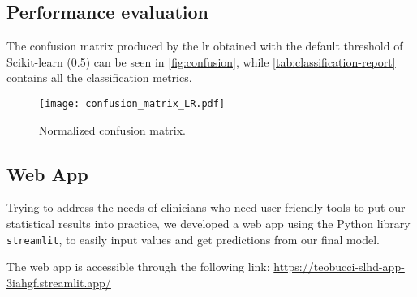 


\subsection{Performance evaluation}

The confusion matrix produced by the \gls{lr} obtained with the default threshold of Scikit-learn (0.5) can be seen in \autoref{fig:confusion}, while \autoref{tab:classification-report} contains all the classification metrics.

\begin{figure}[htpb]
\centering
\texttt{[image: confusion\_matrix\_LR.pdf]}
\caption{Normalized confusion matrix.}
\label{fig:confusion}
\end{figure}



\subsection{Web App}

Trying to address the needs of clinicians who need user friendly tools to put our statistical results into practice, we developed a web app using the Python library \texttt{streamlit}, to easily input values and get predictions from our final model.

The web app is accessible through the following link:
\url{https://teobucci-slhd-app-3iahgf.streamlit.app/}
